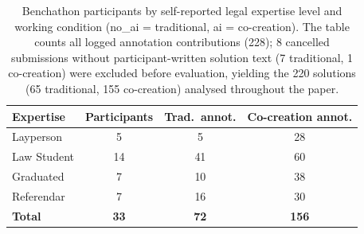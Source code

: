 \begin{table}[t]
\centering\footnotesize
\caption{Benchathon participants by self-reported legal expertise level and working condition (no\_ai = traditional, ai = co-creation). The table counts all logged annotation contributions (228); 8 cancelled submissions without participant-written solution text (7 traditional, 1 co-creation) were excluded before evaluation, yielding the 220 solutions (65 traditional, 155 co-creation) analysed throughout the paper.}
\label{tbl-human-participants}
\setlength{\tabcolsep}{4pt}
\begin{tabular*}{\textwidth}{@{\extracolsep{\fill}}lccc@{}}
\toprule
Expertise & Participants & Trad.~annot. & Co-creation annot. \\
\midrule
Layperson & 5 & 5 & 28 \\
Law Student & 14 & 41 & 60 \\
Graduated & 7 & 10 & 38 \\
Referendar & 7 & 16 & 30 \\
\textbf{Total} & \textbf{33} & \textbf{72} & \textbf{156} \\
\bottomrule
\end{tabular*}
\end{table}
